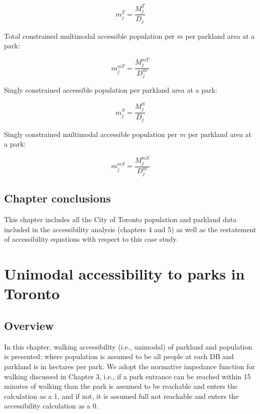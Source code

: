 \documentclass[
11pt, %
oneside, %
english, %
singlespacing, %
]{macthesis} %
\begin{document}
\begin{equation}
\label{eq:total-constrained-market-per-capita}
m^{T}_{j} = \frac{M^{T}_{j}}{D_{j}}
\end{equation} 

Total constrained multimodal accessible population per \(m\) per parkland area at a park:

\begin{equation}
\label{eq:total-constrained-multimodal-market-per-capita}
m^{mT}_{j} = \frac{M^{mT}_{j}}{D^{m}_{j}}
\end{equation} 

Singly constrained accessible population per parkland area at a park:

\begin{equation}
\label{eq:singly-constrained-market-per-capita}
m^{S}_{j} = \frac{M^{S}_{j}}{D_{j}}
\end{equation} 

Singly constrained multimodal accessible population per \(m\) per parkland area at a park:

\begin{equation}
\label{eq:singly-constrained-multimodal-market-per-capita}
m^{mS}_{j} = \frac{M^{mS}_{j}}{D^{m}_{j}}
\end{equation} 

\section{Chapter conclusions}\label{chapter-conclusions-1}

This chapter includes all the City of Toronto population and parkland data included in the accessibility analysis (chapters 4 and 5) as well as the restatement of accessibility equations with respect to this case study.

\chapter{Unimodal accessibility to parks in Toronto}\label{unimodal-accessibility-to-parks-in-toronto}

\section{Overview}\label{overview-3}

In this chapter, walking accessibility (i.e., unimodal) of parkland and population is presented: where population is assumed to be all people at each DB and parkland is in hectares per park. We adopt the normative impedance function for walking discussed in Chapter 3, i.e., if a park entrance can be reached within 15 minutes of walking than the park is assumed to be reachable and enters the calculation as a 1, and if not, it is assumed full not reachable and enters the accessibility calculation as a 0.
\end{document}
